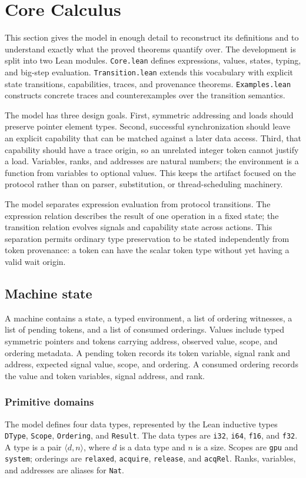 \documentclass[a4paper,USenglish]{lipics-v2021}
\begin{document}
\section{Core Calculus}
This section gives the model in enough detail to reconstruct its definitions and
to understand exactly what the proved theorems quantify over. The development
is split into two Lean modules. \texttt{Core.lean} defines expressions,
values, states, typing, and big-step evaluation. \texttt{Transition.lean}
extends this vocabulary with explicit state transitions, capabilities, traces,
and provenance theorems. \texttt{Examples.lean} constructs concrete traces and
counterexamples over the transition semantics.

The model has three design goals. First, symmetric addressing and loads should
preserve pointer element types. Second, successful synchronization should leave
an explicit capability that can be matched against a later data access. Third,
that capability should have a trace origin, so an unrelated integer token
cannot justify a load. Variables, ranks, and addresses are natural numbers;
the environment is a function from variables to optional values. This keeps
the artifact focused on the protocol rather than on parser, substitution, or
thread-scheduling machinery.

The model separates expression evaluation from protocol transitions. The
expression relation describes the result of one operation in a fixed state;
the transition relation evolves signals and capability state across actions.
This separation permits ordinary type preservation to be stated independently
from token provenance: a token can have the scalar token type without yet
having a valid wait origin.

\subsection{Machine state}
A machine contains a state, a typed environment, a list of ordering witnesses, a list of pending tokens, and a list of consumed orderings. Values include typed symmetric pointers and tokens carrying address, observed value, scope, and ordering metadata. A pending token records its token variable, signal rank and address, expected signal value, scope, and ordering. A consumed ordering records the value and token variables, signal address, and rank.

\subsubsection{Primitive domains}
The model defines four data types, represented by the Lean inductive types
\texttt{DType}, \texttt{Scope}, \texttt{Ordering}, and \texttt{Result}.
The data types are \texttt{i32}, \texttt{i64}, \texttt{f16}, and
\texttt{f32}. A type is a pair \(\langle d,n\rangle\), where \(d\) is a
data type and \(n\) is a size. Scopes are \texttt{gpu} and \texttt{system};
orderings are \texttt{relaxed}, \texttt{acquire}, \texttt{release}, and
\texttt{acqRel}. Ranks, variables, and addresses are aliases for
\texttt{Nat}.
\end{document}
